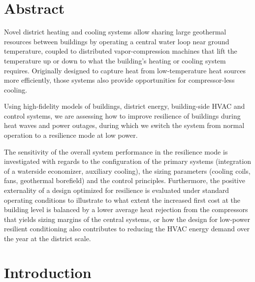 \section{Abstract} \label{sec:abstract}

Novel district heating and cooling systems allow sharing large geothermal resources between buildings by operating a central water loop near ground temperature, coupled to distributed vapor-compression machines that lift the temperature up or down to what the building’s heating or cooling system requires.
Originally designed to capture heat from low-temperature heat sources more efficiently, those systems also provide opportunities for compressor-less cooling.

Using high-fidelity models of buildings, district energy, building-side HVAC and control systems, we are assessing how to improve resilience of buildings during heat waves and power outages, during which we switch the system from normal operation to a resilience mode at low power.

The sensitivity of the overall system performance in the resilience mode is investigated with regards to the configuration of the primary systems (integration of a waterside economizer, auxiliary cooling), the sizing parameters (cooling coils, fans, geothermal borefield) and the control principles.
Furthermore, the positive externality of a design optimized for resilience is evaluated under standard operating conditions to illustrate to what extent the increased first cost at the building level is balanced by a lower average heat rejection from the compressors that yields sizing margins of the central systems, or how the design for low-power resilient conditioning also contributes to reducing the HVAC energy demand over the year at the district scale.


\section{Introduction} \label{sec:introduction}

